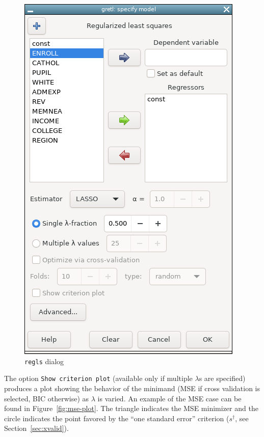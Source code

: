 \documentclass{article}
\begin{document}
\begin{figure}[htbp]
  \begin{center}
  \includegraphics[scale=0.5]{regls_gui}
  \caption{\texttt{regls} dialog}
  \label{fig:regls-gui}
  \end{center}
\end{figure}

The option \texttt{Show criterion plot} (available only if multiple
$\lambda$s are specified) produces a plot showing the behavior of the
minimand (MSE if cross validation is selected, BIC otherwise) as
$\lambda$ is varied. An example of the MSE case can be found in
Figure~\ref{fig:mse-plot}. The triangle indicates the MSE minimizer
and the circle indicates the point favored by the ``one standard
error'' criterion ($s^{\dagger}$, see Section~\ref{sec:xvalid}).
\end{document}
